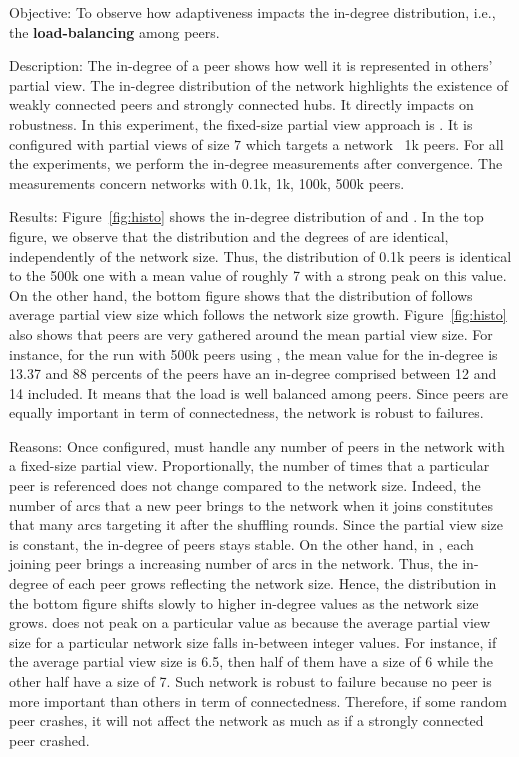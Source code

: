 \begin{asparadesc}
\item[Objective:] To observe how adaptiveness impacts the in-degree
  distribution, i.e., the \textbf{load-balancing} among peers.
\item[Description:] The in-degree of a peer shows how well it is represented in
  others' partial view. The in-degree distribution of the network highlights the
  existence of weakly connected peers and strongly connected hubs. It directly
  impacts on robustness. In this experiment, the fixed-size partial view
  approach is \CYCLON{}. It is configured with partial views of size $7$ which
  targets a network ~1k peers.  For all the experiments, we perform the
  in-degree measurements after convergence. The measurements concern networks
  with 0.1k, 1k, 100k, 500k peers.
\item[Results:] Figure~\ref{fig:histo} shows the in-degree distribution of
  \CYCLON and \SPRAY. In the top figure, we observe that the distribution and
  the degrees of \CYCLON are identical, independently of the network
  size. Thus, the distribution of 0.1k peers is identical to the 500k one with
  a mean value of roughly 7 with a strong peak on this value. On the other
  hand, the bottom figure shows that the distribution of \SPRAY follows average
  partial view size which follows the network size
  growth. Figure~\ref{fig:histo} also shows that peers are very gathered around
  the mean partial view size. For instance, for the run with 500k peers using
  \SPRAY, the mean value for the in-degree is 13.37 and 88 percents of the
  peers have an in-degree comprised between 12 and 14 included. It means that
  the load is well balanced among peers. Since peers are equally important in
  term of connectedness, the network is robust to failures.
\item[Reasons:] Once configured, \CYCLON must handle any number of peers in the
  network with a fixed-size partial view. Proportionally, the number of times
  that a particular peer is referenced does not change compared to the network
  size. Indeed, the number of arcs that a new peer brings to the network when it
  joins constitutes that many arcs targeting it after the shuffling
  rounds. Since the partial view size is constant, the in-degree of peers stays
  stable. On the other hand, in \SPRAY, each joining peer brings a increasing
  number of arcs in the network. Thus, the in-degree of each peer grows
  reflecting the network size. Hence, the distribution in the bottom figure
  shifts slowly to higher in-degree values as the network size grows.  \SPRAY
  does not peak on a particular value as \CYCLON because the average partial
  view size for a particular network size falls in-between integer values. For
  instance, if the average partial view size is 6.5, then half of them have a
  size of 6 while the other half have a size of 7. Such network is robust to
  failure because no peer is more important than others in term of
  connectedness. Therefore, if some random peer crashes, it will not affect the
  network as much as if a strongly connected peer crashed.
\end{asparadesc}

